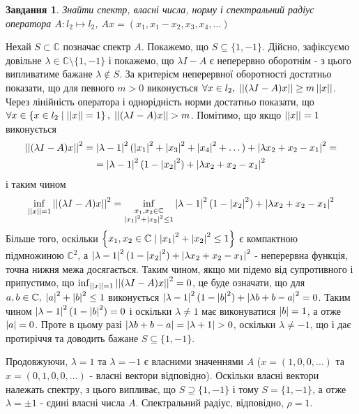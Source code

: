 \documentclass[12pt]{article} %
\newtheorem{prob}{Завдання}
\begin{document}
\begin{prob}Знайти спектр, власні числа, норму і спектральний радіус оператора $A:l_2\mapsto l_2$, $Ax=(x_1,x_1-x_2,x_3,x_4,\dots)$\end{prob}
	Нехай $S\subset\mathbb{C}$ позначає спектр $A$. Покажемо, що $S\subseteq\{1,-1\}$. Дійсно, зафіксуємо довільне $\lambda\in\mathbb{C}\setminus
	\{1,-1\}$ і покажемо, що $\lambda I-A$ є неперервно оборотнім - з цього випливатиме бажане $\lambda\notin S$. За критерієм неперервної
	оборотності достатньо показати, що для певного $m>0$ виконується $\forall x\in l_2,\;\left|\left|(\lambda I-A)x\right|\right|\geq m\left|\left|x\right|\right|$. Через лінійність
	оператора і однорідність норми достатньо показати, що $\forall x\in\mysetn{x\in l_2}{\mynorm{x}=1},\;\mynorm{(\lambda I-A)x}>m$. Помітимо, що
	якщо $\left|\left|x\right|\right|=1$ виконується
	\begin{gather*}
	\left|\left|(\lambda I-A)x\right|\right|^2=\left|\lambda-1\right|^2(\left|x_1\right|^2+\left|x_3\right|^2+\left|x_4\right|^2+\dots)+\left|\lambda x_2+x_2-x_1\right|^2=\\
	=\left|\lambda-1\right|^2(1-\left|x_2\right|^2)+\left|\lambda x_2+x_2-x_1\right|^2
	\end{gather*}
	і таким чином
	\[\inf_{\left|\left|x\right|\right|=1}\left|\left|(\lambda I-A)x\right|\right|^2=\inf_{\substack{x_1,x_2\in\mathbb{C}\\\left|x_1\right|^2+\left|x_2\right|^2\leq 1}}
	\left|\lambda-1\right|^2(1-\left|x_2\right|^2)+\left|\lambda x_2+x_2-x_1\right|^2\]
	Більше того, оскільки $\left\{x_1,x_2\in\mathbb{C}\mid \left|x_1\right|^2+\left|x_2\right|^2\leq 1\right\}$ є компактною підмножиною $\mathbb{C}^2$, а
	$\left|\lambda-1\right|^2(1-\left|x_2\right|^2)+\left|\lambda x_2+x_2-x_1\right|^2$ - неперервна функція, точна нижня межа досягається. Таким чином,
	якщо ми підемо від супротивного і припустимо, що $\inf_{\left|\left|x\right|\right|=1}\left|\left|(\lambda I-A)x\right|\right|^2=0$, це буде означати, що для $a,b\in\mathbb{C}
	,\;\left|a\right|^2+\left|b\right|^2\leq 1$ виконується $\left|\lambda-1\right|^2(1-\left|b\right|^2)+\left|\lambda b+b-a\right|^2=0$. Таким чином
	$\left|\lambda-1\right|^2(1-\left|b\right|^2)=0$ і оскільки $\lambda\neq 1$ має виконуватися $\left|b\right|=1$, а отже $\left|a\right|=0$. Проте в цьому 
	разі	$\myabs{\lambda b+b-a}=\myabs{\lambda+1}>0$, оскільки $\lambda\neq -1$, що і дає протиріччя та доводить бажане $S\subseteq\{1,-1\}$.

	Продовжуючи, $\lambda=1$ та $\lambda=-1$ є власними значеннями $A$ ($x=(1,0,0,\dots)$ та $x=(0,1,0,0,\dots)$ - власні вектори відповідно).
	Оскільки власні вектори належать спектру, з цього випливає, що $S\supseteq\{1,-1\}$ і тому $S=\{1,-1\}$, а отже $\lambda=\pm 1$ - єдині
	власні числа $A$. Спектральний радіус, відповідно, $\rho=1$.
\end{document}
